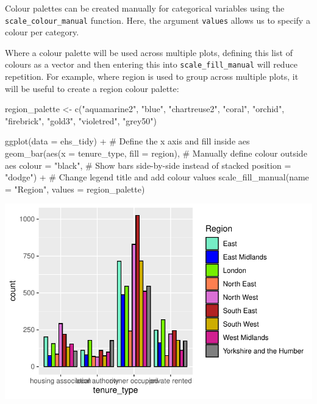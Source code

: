 \documentclass[
  letterpaper,
  DIV=11,
  numbers=noendperiod]{scrreprt}
\newenvironment{Shaded}{\begin{snugshade}}{\end{snugshade}}
\newcommand{\AttributeTok}[1]{\textcolor[rgb]{0.40,0.45,0.13}{#1}}
\newcommand{\CommentTok}[1]{\textcolor[rgb]{0.37,0.37,0.37}{#1}}
\newcommand{\FunctionTok}[1]{\textcolor[rgb]{0.28,0.35,0.67}{#1}}
\newcommand{\NormalTok}[1]{\textcolor[rgb]{0.00,0.23,0.31}{#1}}
\newcommand{\OtherTok}[1]{\textcolor[rgb]{0.00,0.23,0.31}{#1}}
\newcommand{\SpecialCharTok}[1]{\textcolor[rgb]{0.37,0.37,0.37}{#1}}
\newcommand{\StringTok}[1]{\textcolor[rgb]{0.13,0.47,0.30}{#1}}
\begin{document}
Colour palettes can be created manually for categorical variables using
the \texttt{scale\_colour\_manual} function. Here, the argument
\texttt{values} allows us to specify a colour per category.

Where a colour palette will be used across multiple plots, defining this
list of colours as a vector and then entering this into
\texttt{scale\_fill\_manual} will reduce repetition. For example, where
region is used to group across multiple plots, it will be useful to
create a region colour palette:

\begin{Shaded}
\begin{Highlighting}[]
\NormalTok{region\_palette }\OtherTok{\textless{}{-}} \FunctionTok{c}\NormalTok{(}\StringTok{"aquamarine2"}\NormalTok{, }\StringTok{"blue"}\NormalTok{, }\StringTok{"chartreuse2"}\NormalTok{, }\StringTok{"coral"}\NormalTok{, }\StringTok{"orchid"}\NormalTok{,}
                    \StringTok{"firebrick"}\NormalTok{, }\StringTok{"gold3"}\NormalTok{, }\StringTok{"violetred"}\NormalTok{, }\StringTok{"grey50"}\NormalTok{)}

\FunctionTok{ggplot}\NormalTok{(}\AttributeTok{data =}\NormalTok{ ehs\_tidy) }\SpecialCharTok{+} 
  \CommentTok{\# Define the x axis and fill inside aes}
  \FunctionTok{geom\_bar}\NormalTok{(}\FunctionTok{aes}\NormalTok{(}\AttributeTok{x =}\NormalTok{ tenure\_type, }\AttributeTok{fill =}\NormalTok{ region),}
           \CommentTok{\# Manually define colour outside aes}
           \AttributeTok{colour =} \StringTok{"black"}\NormalTok{,}
           \CommentTok{\# Show bars side{-}by{-}side instead of stacked}
           \AttributeTok{position =} \StringTok{"dodge"}\NormalTok{) }\SpecialCharTok{+}
  \CommentTok{\# Change legend title and add colour values}
  \FunctionTok{scale\_fill\_manual}\NormalTok{(}\AttributeTok{name =} \StringTok{"Region"}\NormalTok{, }\AttributeTok{values =}\NormalTok{ region\_palette)}
\end{Highlighting}
\end{Shaded}

\includegraphics{visualisation_files/figure-pdf/region colour palette-1.pdf}
\end{document}
